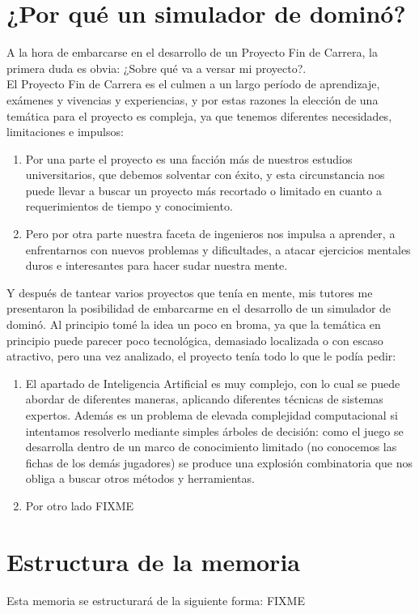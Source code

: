 

\section{¿Por qué un simulador de dominó?}

A la hora de embarcarse en el desarrollo de un Proyecto Fin de Carrera, la primera duda es obvia:
¿Sobre qué va a versar mi proyecto?.\\

El Proyecto Fin de Carrera es el culmen a un largo período de aprendizaje, exámenes y vivencias y
experiencias, y por estas razones la elección de una temática para el proyecto es compleja, ya que
tenemos diferentes necesidades, limitaciones e impulsos:
\begin{enumerate}
    \item Por una parte el proyecto es una facción más de nuestros estudios universitarios, que
            debemos solventar con éxito, y esta circunstancia nos puede llevar a buscar un proyecto
            más recortado o limitado en cuanto a requerimientos de tiempo y conocimiento.
    \item Pero por otra parte nuestra faceta de ingenieros nos impulsa a aprender, a enfrentarnos
            con nuevos problemas y dificultades, a atacar ejercicios mentales duros e interesantes
            para hacer sudar nuestra mente.
\end{enumerate}

Y después de tantear varios proyectos que tenía en mente, mis tutores me presentaron la posibilidad
de embarcarme en el desarrollo de un simulador de dominó. Al principio tomé la idea un poco en broma,
ya que la temática en principio puede parecer poco tecnológica, demasiado localizada o con escaso
atractivo, pero una vez analizado, el proyecto tenía todo lo que le podía pedir:
\begin{enumerate}
    \item El apartado de Inteligencia Artificial es muy complejo, con lo cual se puede abordar de
            diferentes maneras, aplicando diferentes técnicas de sistemas expertos. Además es un
            problema de elevada complejidad computacional si intentamos resolverlo mediante simples
            árboles de decisión: como el juego se desarrolla dentro de un marco de conocimiento
            limitado (no conocemos las fichas de los demás jugadores) se produce una explosión
            combinatoria que nos obliga a buscar otros métodos y herramientas.
    \item Por otro lado FIXME
\end{enumerate}

\section{Estructura de la memoria}

Esta memoria se estructurará de la siguiente forma: FIXME
